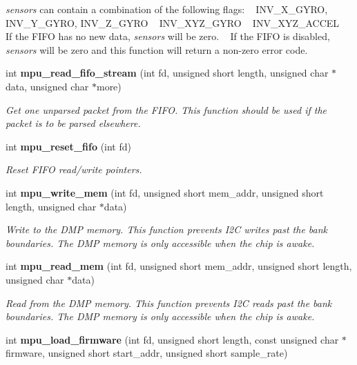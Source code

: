 \begin{DoxyCompactItemize}
\begin{DoxyCompactList}
 {\itshape sensors} can contain a combination of the following flags\+: ~\newline
 I\+N\+V\+\_\+\+X\+\_\+\+G\+Y\+RO, I\+N\+V\+\_\+\+Y\+\_\+\+G\+Y\+RO, I\+N\+V\+\_\+\+Z\+\_\+\+G\+Y\+RO ~\newline
 I\+N\+V\+\_\+\+X\+Y\+Z\+\_\+\+G\+Y\+RO ~\newline
 I\+N\+V\+\_\+\+X\+Y\+Z\+\_\+\+A\+C\+C\+EL ~\newline
 If the F\+I\+FO has no new data, {\itshape sensors} will be zero. ~\newline
 If the F\+I\+FO is disabled, {\itshape sensors} will be zero and this function will return a non-\/zero error code. \end{DoxyCompactList}\item 
int \textbf{ mpu\+\_\+read\+\_\+fifo\+\_\+stream} (int fd, unsigned short length, unsigned char $\ast$data, unsigned char $\ast$more)
\begin{DoxyCompactList}\small\item\em Get one unparsed packet from the F\+I\+FO. This function should be used if the packet is to be parsed elsewhere. \end{DoxyCompactList}\item 
int \textbf{ mpu\+\_\+reset\+\_\+fifo} (int fd)
\begin{DoxyCompactList}\small\item\em Reset F\+I\+FO read/write pointers. \end{DoxyCompactList}\item 
int \textbf{ mpu\+\_\+write\+\_\+mem} (int fd, unsigned short mem\+\_\+addr, unsigned short length, unsigned char $\ast$data)
\begin{DoxyCompactList}\small\item\em Write to the D\+MP memory. This function prevents I2C writes past the bank boundaries. The D\+MP memory is only accessible when the chip is awake. \end{DoxyCompactList}\item 
int \textbf{ mpu\+\_\+read\+\_\+mem} (int fd, unsigned short mem\+\_\+addr, unsigned short length, unsigned char $\ast$data)
\begin{DoxyCompactList}\small\item\em Read from the D\+MP memory. This function prevents I2C reads past the bank boundaries. The D\+MP memory is only accessible when the chip is awake. \end{DoxyCompactList}\item 
int \textbf{ mpu\+\_\+load\+\_\+firmware} (int fd, unsigned short length, const unsigned char $\ast$firmware, unsigned short start\+\_\+addr, unsigned short sample\+\_\+rate)

\end{DoxyCompactItemize}
